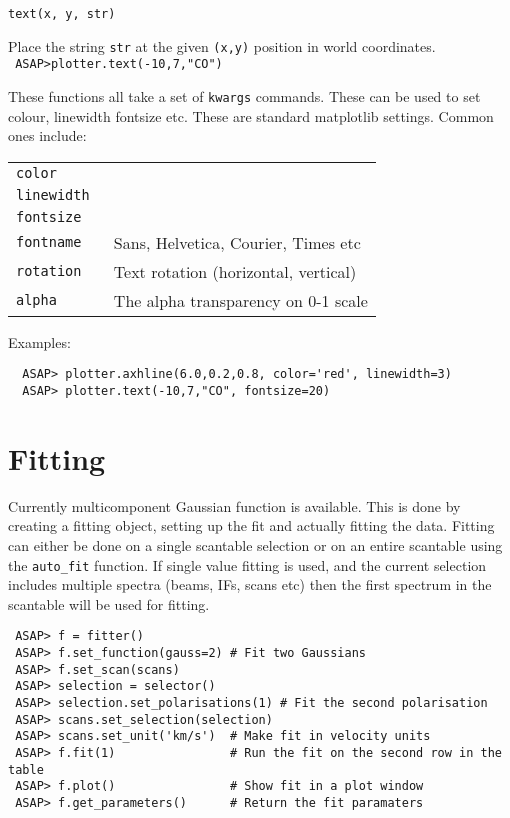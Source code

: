 \documentclass[11pt]{article}
\newcommand{\cmd}[1]{{\tt #1}}
\newcommand{\bigcommanddef}[3]{
  \begin{minipage}[t]{45mm}\tt #1\end{minipage}\hspace{3mm}
  \begin{minipage}[t]{\textwidth-47mm}#2 \\ \tt #3\end{minipage}
}
\begin{document}
\bigcommanddef{text(x, y, str)}{Place the string \cmd{str} at the
 given \cmd{(x,y)} position in world coordinates.}{
ASAP>plotter.text(-10,7,"CO") 
}



These functions all take a set of \cmd{kwargs} commands. These can be
used to set colour, linewidth fontsize etc. These are standard
matplotlib settings. Common ones include:

\begin{tabular}{ll}
 \tt color  \\
 \tt linewidth \\
 \tt fontsize \\
 \tt fontname & Sans, Helvetica, Courier, Times etc\\
 \tt rotation & Text rotation (horizontal, vertical) \\
 \tt alpha & The alpha transparency on 0-1 scale\\
\end{tabular}

Examples: 
\begin{verbatim}
  ASAP> plotter.axhline(6.0,0.2,0.8, color='red', linewidth=3)
  ASAP> plotter.text(-10,7,"CO", fontsize=20)
\end{verbatim}

\section{Fitting}

Currently multicomponent Gaussian function is
available. This is done by creating a fitting object, setting up the
fit and actually fitting the data. Fitting can either be done on a
single scantable selection or on an entire scantable using the
\cmd{auto\_fit} function. If single value fitting is used, and the
current selection includes multiple spectra (beams, IFs, scans etc)
then the first spectrum in the scantable will be used for fitting.

\begin{verbatim}
 ASAP> f = fitter()
 ASAP> f.set_function(gauss=2) # Fit two Gaussians
 ASAP> f.set_scan(scans)
 ASAP> selection = selector()
 ASAP> selection.set_polarisations(1) # Fit the second polarisation
 ASAP> scans.set_selection(selection)
 ASAP> scans.set_unit('km/s')  # Make fit in velocity units
 ASAP> f.fit(1)                # Run the fit on the second row in the table
 ASAP> f.plot()                # Show fit in a plot window
 ASAP> f.get_parameters()      # Return the fit paramaters
\end{verbatim}
\end{document}

